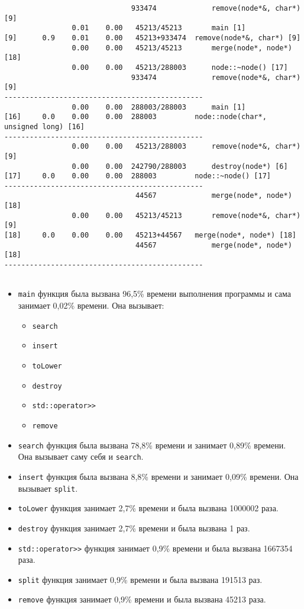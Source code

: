 \documentclass[12pt]{article}
\begin{document}
\begin{verbatim}
                              933474             remove(node*&, char*) [9]
                0.01    0.00   45213/45213       main [1]
[9]      0.9    0.01    0.00   45213+933474  remove(node*&, char*) [9]
                0.00    0.00   45213/45213       merge(node*, node*) [18]
                0.00    0.00   45213/288003      node::~node() [17]
                              933474             remove(node*&, char*) [9]
-----------------------------------------------
                0.00    0.00  288003/288003      main [1]
[16]     0.0    0.00    0.00  288003         node::node(char*, unsigned long) [16]
-----------------------------------------------
                0.00    0.00   45213/288003      remove(node*&, char*) [9]
                0.00    0.00  242790/288003      destroy(node*) [6]
[17]     0.0    0.00    0.00  288003         node::~node() [17]
-----------------------------------------------
                               44567             merge(node*, node*) [18]
                0.00    0.00   45213/45213       remove(node*&, char*) [9]
[18]     0.0    0.00    0.00   45213+44567   merge(node*, node*) [18]
                               44567             merge(node*, node*) [18]
-----------------------------------------------
    
\end{verbatim}

\begin{itemize}
    \item \texttt{main} функция была вызвана 96,5\% времени выполнения программы и сама занимает 0,02\% времени. Она вызывает:
    \begin{itemize}
        \item \texttt{search}
        \item \texttt{insert}
        \item \texttt{toLower}
        \item \texttt{destroy}
        \item \texttt{std::operator>>}
        \item \texttt{remove}
    \end{itemize}
    \item \texttt{search} функция была вызвана 78,8\% времени и занимает 0,89\% времени. Она вызывает саму себя и \texttt{search}.
    \item \texttt{insert} функция была вызвана 8,8\% времени и занимает 0,09\% времени. Она вызывает \texttt{split}.
    \item \texttt{toLower} функция занимает 2,7\% времени и была вызвана 1000002 раза.
    \item \texttt{destroy} функция занимает 2,7\% времени и была вызвана 1 раз.
    \item \texttt{std::operator>>} функция занимает 0,9\% времени и была вызвана 1667354 раза.
    \item \texttt{split} функция занимает 0,9\% времени и была вызвана 191513 раз.
    \item \texttt{remove} функция занимает 0,9\% времени и была вызвана 45213 раза.
\end{itemize}
\end{document}
